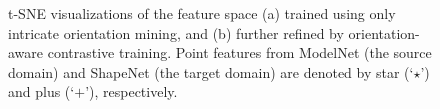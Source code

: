 \begin{figure}[t]
    \centering
    \vspace{-2mm}
    \caption{t-SNE visualizations of the feature space (a) trained using only intricate orientation mining, and (b) further refined by orientation-aware contrastive training. Point features from ModelNet (the source domain) and ShapeNet (the target domain) are denoted by star (`$\star$') and plus (`$+$'), respectively.}
    \label{fig:feature}
    \vspace{-6mm}
\end{figure}
